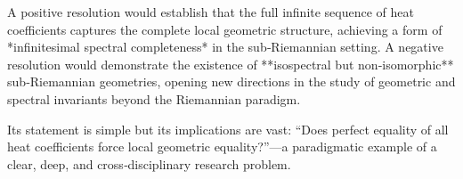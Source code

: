 A positive resolution would establish that the full infinite sequence of heat coefficients captures the complete local geometric structure, achieving a form of *infinitesimal spectral completeness* in the sub‑Riemannian setting. A negative resolution would demonstrate the existence of **isospectral but non‑isomorphic** sub‑Riemannian geometries, opening new directions in the study of geometric and spectral invariants beyond the Riemannian paradigm.  

Its statement is simple but its implications are vast: “Does perfect equality of all heat coefficients force local geometric equality?”—a paradigmatic example of a clear, deep, and cross‑disciplinary research problem.